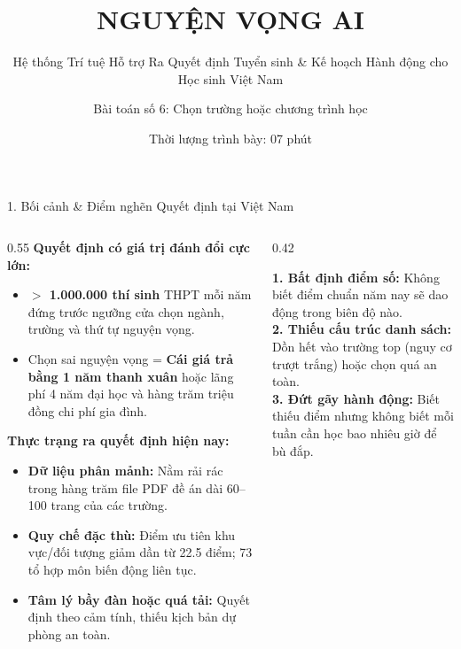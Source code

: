 \documentclass[aspectratio=169, 10pt]{beamer}
\title[Nguyện Vọng AI - Decision Intelligence]{\textbf{NGUYỆN VỌNG AI}}
\subtitle{Hệ thống Trí tuệ Hỗ trợ Ra Quyết định Tuyển sinh \& Kế hoạch Hành động cho Học sinh Việt Nam}
\author[Đội thi Hackathon]{Bài toán số 6: Chọn trường hoặc chương trình học}
\institute[Decision Intelligence Challenge 2026]{
  \textbf{Cuộc thi Decision Intelligence Challenge}\\
  \textit{Working Web Demo:} \texttt{https://nguyenvongai.pages.dev}
}
\date{Thời lượng trình bày: 07 phút}
\begin{document}
\begin{frame}
  \titlepage
\end{frame}

\begin{frame}{1. Bối cảnh \& Điểm nghẽn Quyết định tại Việt Nam}
\begin{columns}[T]
  \begin{column}{0.55\textwidth}
    \textbf{Quyết định có giá trị đánh đổi cực lớn:}
    \begin{itemize}
      \item \textbf{$>$ 1.000.000 thí sinh} THPT mỗi năm đứng trước ngưỡng cửa chọn ngành, trường và thứ tự nguyện vọng.
      \item Chọn sai nguyện vọng = \alert{\textbf{Cái giá trả bằng 1 năm thanh xuân}} hoặc lãng phí 4 năm đại học và hàng trăm triệu đồng chi phí gia đình.
    \end{itemize}
    \vspace{0.3cm}
    \textbf{Thực trạng ra quyết định hiện nay:}
    \begin{itemize}
      \item \textbf{Dữ liệu phân mảnh:} Nằm rải rác trong hàng trăm file PDF đề án dài 60–100 trang của các trường.
      \item \textbf{Quy chế đặc thù:} Điểm ưu tiên khu vực/đối tượng giảm dần từ 22.5 điểm; 73 tổ hợp môn biến động liên tục.
      \item \textbf{Tâm lý bầy đàn hoặc quá tải:} Quyết định theo cảm tính, thiếu kịch bản dự phòng an toàn.
    \end{itemize}
  \end{column}
  
  \begin{column}{0.42\textwidth}
    \begin{tcolorbox}[colback=NenNhe,colframe=XanhChuDao,title=\textbf{3 Thách thức Ra quyết định}]
      \small
      \textbf{1. Bất định điểm số:} Không biết điểm chuẩn năm nay sẽ dao động trong biên độ nào.\\
      \textbf{2. Thiếu cấu trúc danh sách:} Dồn hết vào trường top (nguy cơ trượt trắng) hoặc chọn quá an toàn.\\
      \textbf{3. Đứt gãy hành động:} Biết thiếu điểm nhưng không biết mỗi tuần cần học bao nhiêu giờ để bù đắp.
    \end{tcolorbox}
  \end{column}
\end{columns}
\end{frame}
\end{document}
